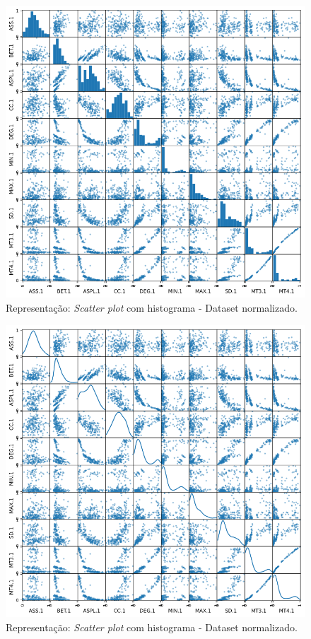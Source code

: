 \documentclass[
	article,			%
	11pt,				%
	oneside,			%
	a4paper,			%
	english,			%
	brazil,				%
	sumario=tradicional
	]{abntex2}
\begin{document}
\newpage
\begin{figure}[h!]
 \centering
 \includegraphics[scale=0.5]{fig/scatter_hist02.png}
 \caption{Representação: \textit{Scatter plot} com histograma - Dataset normalizado.}
 \label{fig:scatter_hist02}
\end{figure}

\newpage
\begin{figure}[h!]
 \centering
 \includegraphics[scale=0.5]{fig/scatter_kde02.png}
 \caption{Representação: \textit{Scatter plot} com histograma - Dataset normalizado.}
 \label{fig:scatter_kde02}
\end{figure}
\end{document}
